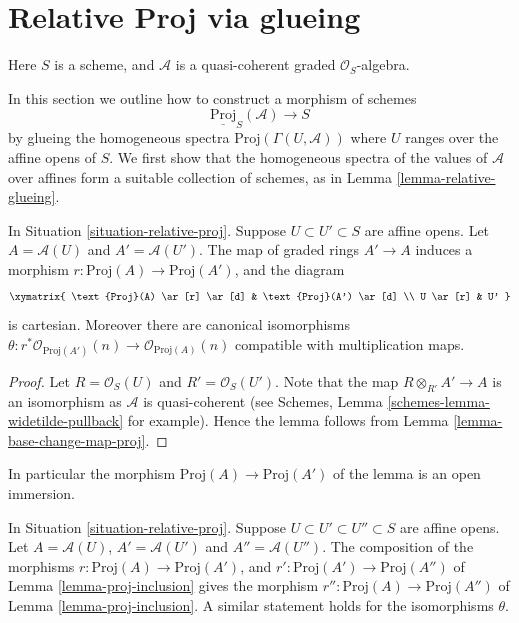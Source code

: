 \section{Relative Proj via glueing}
\label{section-relative-proj-via-glueing}

\begin{situation}
\label{situation-relative-proj}
Here $S$ is a scheme, and $\mathcal{A}$
is a quasi-coherent graded $\mathcal{O}_S$-algebra.
\end{situation}

\noindent
In this section we outline how to construct a morphism
of schemes
$$
\underline{\text{Proj}}_S(\mathcal{A}) \longrightarrow S
$$
by glueing the homogeneous spectra $\text{Proj}(\Gamma(U, \mathcal{A}))$
where $U$ ranges over the affine opens of $S$. We first show that the
homogeneous spectra of the values of $\mathcal{A}$ over affines form a
suitable collection of schemes, as in Lemma \ref{lemma-relative-glueing}.

\begin{lemma}
\label{lemma-proj-inclusion}
In Situation \ref{situation-relative-proj}.
Suppose $U \subset U' \subset S$ are affine opens.
Let $A = \mathcal{A}(U)$ and $A' = \mathcal{A}(U')$.
The map of graded rings $A' \to A$ induces a morphism
$r : \text{Proj}(A) \to \text{Proj}(A')$, and the diagram
$$
\xymatrix{
\text{Proj}(A) \ar[r] \ar[d] &
\text{Proj}(A') \ar[d] \\
U \ar[r] &
U'
}
$$
is cartesian. Moreover there are canonical isomorphisms
$\theta : r^*\mathcal{O}_{\text{Proj}(A')}(n) \to
\mathcal{O}_{\text{Proj}(A)}(n)$ compatible with multiplication maps.
\end{lemma}

\begin{proof}
Let $R = \mathcal{O}_S(U)$ and $R' = \mathcal{O}_S(U')$.
Note that the map $R \otimes_{R'} A' \to A$ is an isomorphism as
$\mathcal{A}$ is quasi-coherent
(see Schemes, Lemma \ref{schemes-lemma-widetilde-pullback} for example).
Hence the lemma follows from
Lemma \ref{lemma-base-change-map-proj}.
\end{proof}

\noindent
In particular the morphism $\text{Proj}(A) \to \text{Proj}(A')$
of the lemma is an open immersion.

\begin{lemma}
\label{lemma-transitive-proj}
In Situation \ref{situation-relative-proj}.
Suppose $U \subset U' \subset U'' \subset S$ are affine opens.
Let $A = \mathcal{A}(U)$, $A' = \mathcal{A}(U')$ and $A'' = \mathcal{A}(U'')$.
The composition of the morphisms
$r : \text{Proj}(A) \to \text{Proj}(A')$, and
$r' : \text{Proj}(A') \to \text{Proj}(A'')$ of
Lemma \ref{lemma-proj-inclusion} gives the
morphism $r'' : \text{Proj}(A) \to \text{Proj}(A'')$
of Lemma \ref{lemma-proj-inclusion}. A similar statement
holds for the isomorphisms $\theta$.
\end{lemma}

